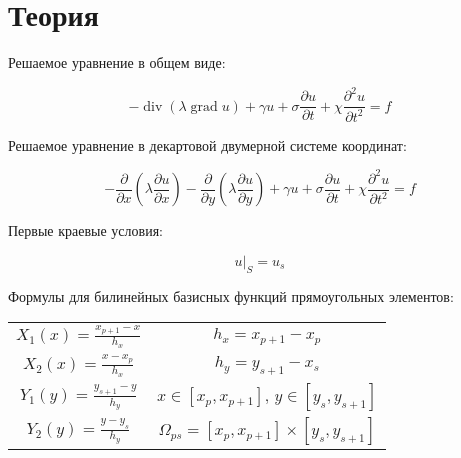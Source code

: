 ﻿

\newcommand{\roubr}[1]{\left(#1\right)}  %
\newcommand{\sqbr}[1]{\left[#1\right]}   %
\newcommand{\cubr}[1]{\left\{#1\right\}} %

\newcommand{\conclusion}[0]{\noindent\textbf{Вывод: }}

\newcommand{\mb}[1]{\mathbf{#1}}

\newcommand{\myd}[1]{\operatorname{d}\!#1}

\newcommand{\mydiv}[0]{\operatorname{div}}
\newcommand{\mygrad}[0]{\operatorname{grad}}
\newcommand{\mypartial}[2]{\frac{\partial #1}{\partial #2}}
\newcommand{\mypartialpow}[3]{\frac{\partial^{#3} #1}{\partial #2^{#3}}}
\newcommand{\myintegral}[2]{\int\limits_{#1}^{#2}}

\section{Теория}

Решаемое уравнение в общем виде:

$$ -\mydiv\roubr{\lambda\mygrad u} + \gamma u + \sigma \mypartial{u}{t} + \chi \mypartialpow{u}{t}{2} = f $$

Решаемое уравнение в декартовой двумерной системе координат:

$$ -\mypartial{}{x}\roubr{\lambda\mypartial{u}{x}} - \mypartial{}{y}\roubr{\lambda\mypartial{u}{y}} + \gamma u + \sigma \mypartial{u}{t} + \chi \mypartialpow{u}{t}{2} = f $$

Первые краевые условия:

$$ u|_{S} = u_s $$

Формулы для билинейных базисных функций прямоугольных элементов:

\begin{center}\noindent\begin{tabular}{cc}
$\displaystyle X_1(x) = \frac{x_{p+1}-x}{h_x} $ & $\displaystyle h_x = x_{p+1}-x_p $ \\
$\displaystyle X_2(x) = \frac{x-x_p}{h_x} $ & $\displaystyle h_y = y_{s+1}-x_s $ \\
$\displaystyle Y_1(y) = \frac{y_{s+1}-y}{h_y} $ & $\displaystyle x \in [x_p, x_{p+1}],\, y \in [y_s, y_{s+1}] $ \\
$\displaystyle Y_2(y) = \frac{y-y_s}{h_y} $ & $\displaystyle \Omega_{ps} = [x_p, x_{p+1}] \times [y_s, y_{s+1}] $
\end{tabular}\end{center}

